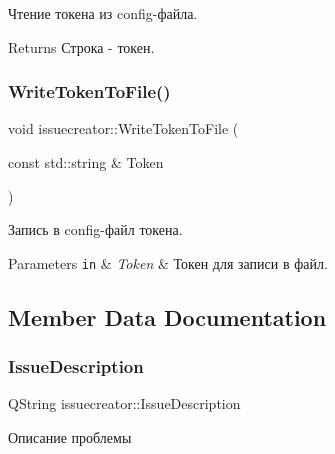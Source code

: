 Чтение токена из config-\/файла. 

\begin{DoxyReturn}{Returns}
Строка -\/ токен. 
\end{DoxyReturn}
\mbox{\label{classissuecreator_a7d8b501ffe33324bad13029113674d3d}} 
\subsubsection{\texorpdfstring{Write\+Token\+To\+File()}{WriteTokenToFile()}}
{\footnotesize\ttfamily void issuecreator\+::\+Write\+Token\+To\+File (\begin{DoxyParamCaption}\item[{const std\+::string \&}]{Token }\end{DoxyParamCaption})}



Запись в config-\/файл токена. 


\begin{DoxyParams}[1]{Parameters}
\mbox{\tt in}  & {\em Token} & Токен для записи в файл. \\
\hline
\end{DoxyParams}


\subsection{Member Data Documentation}
\mbox{\label{classissuecreator_a7d6bc72a5a8ddafa35e3d0e759918586}} 
\subsubsection{\texorpdfstring{Issue\+Description}{IssueDescription}}
{\footnotesize\ttfamily Q\+String issuecreator\+::\+Issue\+Description\hspace{0.3cm}{\ttfamily [private]}}



Описание проблемы 

\mbox{\label{classissuecreator_ab95a97a1a87dae8170bfaf0c95859413}} 
